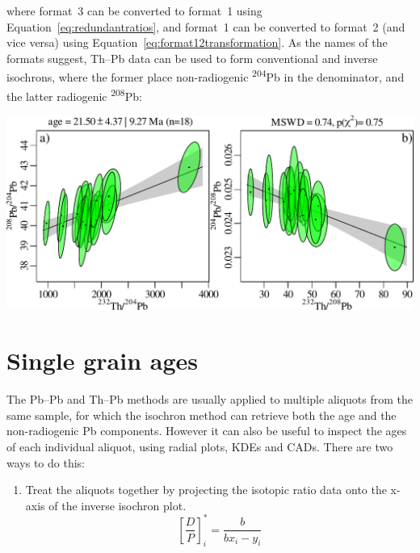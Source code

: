 \begin{refsection}
\noindent where format~3 can be converted to format~1 using
Equation~\ref{eq:redundantratios}, and format~1 can be converted to
format~2 (and vice versa) using
Equation~\ref{eq:format12transformation}. As the names of the formats
suggest, Th--Pb data can be used to form conventional and inverse
isochrons, where the former place non-radiogenic
\textsuperscript{204}Pb in the denominator, and the latter radiogenic
\textsuperscript{208}Pb:\\

\noindent\begin{minipage}[t][][b]{.7\linewidth}
\includegraphics[width=\textwidth]{../figures/ThPb.pdf}
\end{minipage}
\begin{minipage}[t][][t]{.3\linewidth}
\end{minipage}

\section{Single grain ages}\label{sec:ThPbPbradial}

The Pb--Pb and Th--Pb methods are usually applied to multiple aliquots
from the same sample, for which the isochron method can retrieve both
the age and the non-radiogenic Pb components. However it can also be
useful to inspect the ages of each individual aliquot, using radial
plots, KDEs and CADs. There are two ways to do this:

\begin{enumerate}
  \item Treat the aliquots together by projecting the isotopic ratio
    data onto the x-axis of the inverse isochron plot.
    \begin{equation}
      \left[\frac{D}{P}\right]_i^\ast = \frac{b}{b x_i - y_i}
      \label{eq:DP*inverse}
    \end{equation}
    

\end{enumerate}
\end{refsection}
